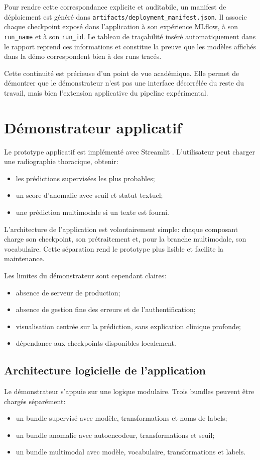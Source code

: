 \documentclass[11pt,a4paper]{article}
\newif\ifsectionbreakenabled
\let\oldsection\section
\renewcommand{\section}[1]{%
    \ifsectionbreakenabled
        \clearpage
    \else
        \sectionbreakenabledtrue
    \fi
    \oldsection{#1}%
}
\begin{document}
Pour rendre cette correspondance explicite et auditabile, un manifest de d\'eploiement est g\'en\'er\'e dans \texttt{artifacts/deployment\_manifest.json}. Il associe chaque checkpoint expos\'e dans l'application \`a son exp\'erience MLflow, \`a son \texttt{run\_name} et \`a son \texttt{run\_id}. Le tableau de tra\c{c}abilit\'e ins\'er\'e automatiquement dans le rapport reprend ces informations et constitue la preuve que les mod\`eles affich\'es dans la d\'emo correspondent bien \`a des runs trac\'es.

Cette continuit\'e est pr\'ecieuse d'un point de vue acad\'emique. Elle permet de d\'emontrer que le d\'emonstrateur n'est pas une interface d\'ecorr\'el\'ee du reste du travail, mais bien l'extension applicative du pipeline exp\'erimental.

\section{D\'emonstrateur applicatif}
Le prototype applicatif est impl\'ement\'e avec Streamlit \cite{streamlitdocs}. L'utilisateur peut charger une radiographie thoracique, obtenir:
\begin{itemize}
    \item les pr\'edictions supervis\'ees les plus probables;
    \item un score d'anomalie avec seuil et statut textuel;
    \item une pr\'ediction multimodale si un texte est fourni.
\end{itemize}

L'architecture de l'application est volontairement simple: chaque composant charge son checkpoint, son pr\'etraitement et, pour la branche multimodale, son vocabulaire. Cette s\'eparation rend le prototype plus lisible et facilite la maintenance.

Les limites du d\'emonstrateur sont cependant claires:
\begin{itemize}
    \item absence de serveur de production;
    \item absence de gestion fine des erreurs et de l'authentification;
    \item visualisation centr\'ee sur la pr\'ediction, sans explication clinique profonde;
    \item d\'ependance aux checkpoints disponibles localement.
\end{itemize}

\subsection{Architecture logicielle de l'application}
Le d\'emonstrateur s'appuie sur une logique modulaire. Trois bundles peuvent \^etre charg\'es s\'epar\'ement:
\begin{itemize}
    \item un bundle supervis\'e avec mod\`ele, transformations et noms de labels;
    \item un bundle anomalie avec autoencodeur, transformations et seuil;
    \item un bundle multimodal avec mod\`ele, vocabulaire, transformations et labels.
\end{itemize}
\end{document}
